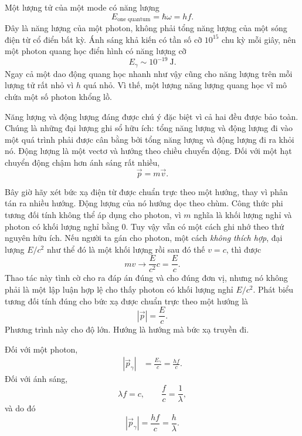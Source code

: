 Một lượng tử của một mode có năng lượng
\begin{equation}
E_{\text{one quantum}}=\hbar\omega=hf.
\end{equation}
Đây là năng lượng của một photon, không phải tổng năng lượng của một sóng điện từ cổ điển bất kỳ. Ánh sáng khả kiến có tần số cỡ \(10^{15}\) chu kỳ mỗi giây, nên một photon quang học điển hình có năng lượng cỡ
\begin{equation}
E_\gamma\sim 10^{-19}\ \mathrm{J}.
\end{equation}
Ngay cả một dao động quang học nhanh như vậy cũng cho năng lượng trên mỗi lượng tử rất nhỏ vì \(h\) quá nhỏ. Vì thế, một lượng năng lượng quang học vĩ mô chứa một số photon khổng lồ.

Năng lượng và động lượng đáng được chú ý đặc biệt vì cả hai đều được bảo toàn. Chúng là những đại lượng ghi sổ hữu ích: tổng năng lượng và động lượng đi vào một quá trình phải được cân bằng bởi tổng năng lượng và động lượng đi ra khỏi nó. Động lượng là một vectơ và hướng theo chiều chuyển động. Đối với một hạt chuyển động chậm hơn ánh sáng rất nhiều,
\begin{equation}
\vec p=m\vec v.
\end{equation}

Bây giờ hãy xét bức xạ điện từ được chuẩn trực theo một hướng, thay vì phân tán ra nhiều hướng. Động lượng của nó hướng dọc theo chùm. Công thức phi tương đối tính không thể áp dụng cho photon, vì \(m\) nghĩa là khối lượng nghỉ và photon có khối lượng nghỉ bằng 0. Tuy vậy vẫn có một cách ghi nhớ theo thứ nguyên hữu ích. Nếu người ta gán cho photon, một cách \emph{không thích hợp}, đại lượng \(E/c^2\) như thể đó là một khối lượng rồi sau đó thế \(v=c\), thì được
\begin{equation}
mv\longrightarrow \frac{E}{c^2}c=\frac{E}{c}.
\end{equation}
Thao tác này tình cờ cho ra đáp án đúng và cho đúng đơn vị, nhưng nó không phải là một lập luận hợp lệ cho thấy photon có khối lượng nghỉ \(E/c^2\). Phát biểu tương đối tính đúng cho bức xạ được chuẩn trực theo một hướng là
\begin{equation}
|\vec p|=\frac{E}{c}.
\end{equation}
Phương trình này cho độ lớn. Hướng là hướng mà bức xạ truyền đi.

Đối với một photon,
\begin{align}
|\vec p_\gamma|
&=\frac{E_\gamma}{c}
=\frac{hf}{c}.
\end{align}
Đối với ánh sáng,
\begin{equation}
\lambda f=c,
\qquad
\frac{f}{c}=\frac{1}{\lambda},
\end{equation}
và do đó
\begin{equation}
|\vec p_\gamma|=\frac{hf}{c}=\frac{h}{\lambda}.
\end{equation}

